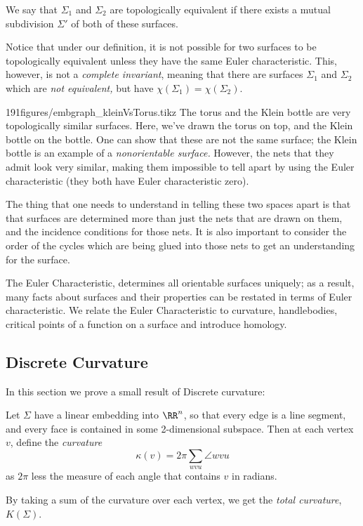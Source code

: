 \begin{definition}
We say that $\Sigma_1$ and $\Sigma_2$ are topologically equivalent if there exists a mutual subdivision $\Sigma'$ of both of these surfaces. 
\end{definition}
Notice that under our definition, it is not possible for two surfaces to be topologically equivalent unless they have the same Euler characteristic. This, however, is not a \emph{complete invariant}, meaning that there are surfaces $\Sigma_1$ and $\Sigma_2$ which are \emph{not equivalent,} but have $\chi(\Sigma_1)=\chi(\Sigma_2)$. \\

\begin{examplefigureenv}{191figures/embgraph_kleinVsTorus.tikz}
	The torus and the Klein bottle are very topologically similar surfaces. Here, we've drawn the torus on top, and the Klein bottle on the bottle. One can show that these are not the same surface; the Klein bottle is an example of a \emph{nonorientable surface.} However, the nets that they admit look very similar, making them impossible to tell apart by using the Euler characteristic (they both have Euler characteristic zero).

The thing that one needs to understand in telling these two spaces apart is that that surfaces are determined more than just the nets that are drawn on them, and the incidence conditions for those nets. It is also important to consider the order of the cycles which are being glued into those nets to get an understanding for the surface.
\end{examplefigureenv}
\begin{elevator}
The Euler Characteristic, determines all orientable surfaces uniquely; as a result, many facts about surfaces and their properties can be restated in terms of Euler characteristic. We relate the Euler Characteristic to curvature, handlebodies, critical points of a function on a surface and introduce homology. 
\label{sec:planar:euler}
\end{elevator}
\subsection{Discrete Curvature}

In this section we prove a small result of Discrete curvature:
\begin{definition}
Let $\Sigma$ have a linear embedding into $\RR^n$, so that every edge is a line segment, and every face is contained in some 2-dimensional subspace. Then at each vertex $v$, define the \emph{curvature} 
\[\kappa(v)=2\pi \sum_{wvu} \angle wvu\]
as $2\pi$ less the measure of each angle that contains $v$ in radians. 
\end{definition}
By taking a sum of the curvature over each vertex, we get the \emph{total curvature}, $K(\Sigma)$.\\

